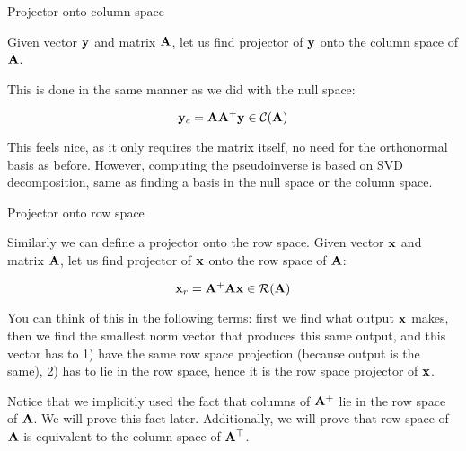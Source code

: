 \documentclass{beamer}
\begin{document}
\begin{frame}{Projector onto column space}
\begin{flushleft}

Given vector $\mathbf{y}$ and matrix $\mathbf{A}$, let us find projector of $\mathbf{y}$ onto the column space of $\mathbf{A}$.

\bigskip

This is done in the same manner as we did with the null space:

\begin{equation}
    \mathbf{y}_c = \mathbf{A}\mathbf{A}^+ \mathbf{y} \in \mathcal{C}(\mathbf{A})
\end{equation}

This feels nice, as it only requires the matrix itself, no need for the orthonormal basis as before. However, computing the pseudoinverse is based on SVD decomposition, same as finding a basis in the null space or the column space.

\end{flushleft}
\end{frame}



\begin{frame}{Projector onto row space}
\begin{flushleft}

Similarly we can define a projector onto the row space. Given vector $\mathbf{x}$ and matrix $\mathbf{A}$, let us find projector of $\mathbf{x}$ onto the row space of $\mathbf{A}$:

\begin{equation}
    \mathbf{x}_r = \mathbf{A}^+\mathbf{A} \mathbf{x} \in \mathcal{R}(\mathbf{A})
\end{equation}

You can think of this in the following terms: first we find what output $\mathbf{x}$ makes, then we find the smallest norm vector that produces this same output, and this vector has to 1) have the same row space projection (because output is the same), 2) has to lie in the row space, hence it is the row space projector of $\mathbf{x}$.

\bigskip

Notice that we implicitly used the fact that columns of $\mathbf{A}^+$ lie in the row space of $\mathbf{A}$. We will prove this fact later. Additionally, we will prove that row space of $\mathbf{A}$ is equivalent to the column space of $\mathbf{A}^\top$.

\end{flushleft}
\end{frame}
\end{document}
